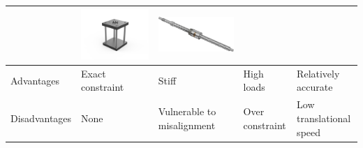 \begin{table}[h]
\begin{tabular}{p{3cm}|p{3cm}p{3cm}p{3cm}p{3cm}}
\begin{minipage}{3cm}
    \end{minipage} 
    &     
    \begin{minipage}{3cm}
      \includegraphics[width=\linewidth]{images/column_press.png}
    \end{minipage}
    &
    \begin{minipage}{3cm}
      \includegraphics[width=\linewidth]{images/spindle.png}
    \end{minipage} \\ \hline
Advantages               & Exact constraint & Stiff & High loads & Relatively accurate \\ \hline
Disadvantages            & None & Vulnerable to misalignment & Over constraint & Low translational speed  \\ 
\end{tabular}
\end{table}

